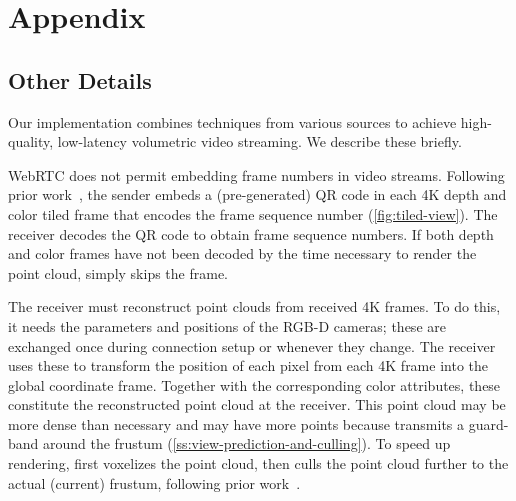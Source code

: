 \appendix
\renewcommand\thefigure{A.\arabic{figure}}
\renewcommand\thesection{\Alph{section}}
\renewcommand{\thealgocf}{A.\arabic{algocf}}
\renewcommand\thetable{A.\arabic{table}}
\setcounter{section}{0}
\setcounter{algocf}{0}
\setcounter{figure}{0}
\setcounter{table}{0}

\section{Appendix}
\label{s:appendix}

\subsection{Other Details}
\label{ss:optimizations}

Our \sysname{} implementation combines techniques from various sources to achieve high-quality, low-latency volumetric video streaming. We describe these briefly.

%
WebRTC does not permit embedding frame numbers in video streams.
%
Following prior work~\cite{salsify}, the \sysname{} sender embeds a (pre-generated) QR code in each 4K depth and color tiled frame that encodes the frame sequence number (\cref{fig:tiled-view}).
%
The receiver decodes the QR code to obtain frame sequence numbers.
%
If both depth and color frames have not been decoded by the time necessary to render the point cloud, \sysname{} simply skips the frame.

%
The receiver must reconstruct point clouds from received 4K frames.
%
To do this, it needs the parameters and positions of the RGB-D cameras; these are exchanged once during connection setup or whenever they change.
%
The receiver uses these to transform the position of each pixel from each 4K frame into the global coordinate frame.
%
Together with the corresponding color attributes, these constitute the reconstructed point cloud at the receiver.
%
This point cloud may be more dense than necessary and may have more points because \sysname{} transmits a guard-band around the frustum (\cref{ss:view-prediction-and-culling}).
%
To speed up rendering, \sysname{} first voxelizes the point cloud, then culls the point cloud further to the actual (current) frustum, following prior work~\cite{vivo,groot}.

